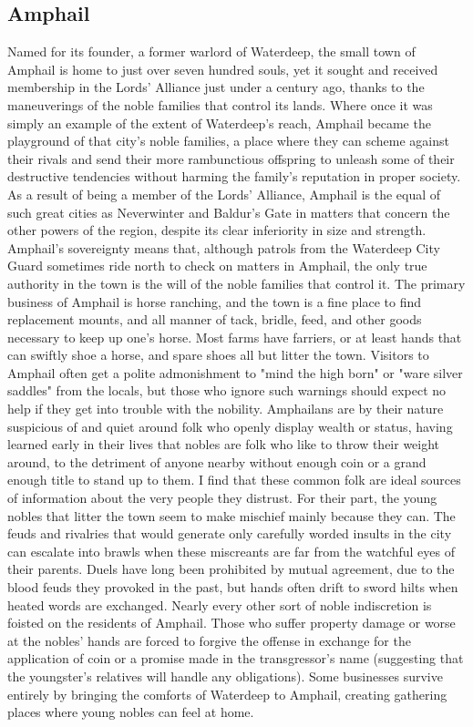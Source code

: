 \documentclass[10pt,a4paper,twoside,twocolumn,openany,bg=print,nodeprecatedcode]{dndbook}
\begin{document}
\subsection{Amphail}
Named for its founder, a former warlord of Waterdeep, the small town of Amphail is home to just over seven hundred souls, yet it sought and received membership in the Lords' Alliance just under a century ago, thanks to the maneuverings of the noble families that control its lands. Where once it was simply an example of the extent of Waterdeep's reach, Amphail became the playground of that city's noble families, a place where they can scheme against their rivals and send their more rambunctious offspring to unleash some of their destructive tendencies without harming the family's reputation in proper society. As a result of being a member of the Lords' Alliance, Amphail is the equal of such great cities as Neverwinter and Baldur's Gate in matters that concern the other powers of the region, despite its clear inferiority in size and strength.
Amphail's sovereignty means that, although patrols from the Waterdeep City Guard sometimes ride north to check on matters in Amphail, the only true authority in the town is the will of the noble families that control it. The primary business of Amphail is horse ranching, and the town is a fine place to find replacement mounts, and all manner of tack, bridle, feed, and other goods necessary to keep up one's horse. Most farms have farriers, or at least hands that can swiftly shoe a horse, and spare shoes all but litter the town.
Visitors to Amphail often get a polite admonishment to "mind the high born" or "ware silver saddles" from the locals, but those who ignore such warnings should expect no help if they get into trouble with the nobility. Amphailans are by their nature suspicious of and quiet around folk who openly display wealth or status, having learned early in their lives that nobles are folk who like to throw their weight around, to the detriment of anyone nearby without enough coin or a grand enough title to stand up to them. I find that these common folk are ideal sources of information about the very people they distrust.
For their part, the young nobles that litter the town seem to make mischief mainly because they can. The feuds and rivalries that would generate only carefully worded insults in the city can escalate into brawls when these miscreants are far from the watchful eyes of their parents. Duels have long been prohibited by mutual agreement, due to the blood feuds they provoked in the past, but hands often drift to sword hilts when heated words are exchanged. Nearly every other sort of noble indiscretion is foisted on the residents of Amphail. Those who suffer property damage or worse at the nobles' hands are forced to forgive the offense in exchange for the application of coin or a promise made in the transgressor's name (suggesting that the youngster's relatives will handle any obligations). Some businesses survive entirely by bringing the comforts of Waterdeep to Amphail, creating gathering places where young nobles can feel at home.
\end{document}

